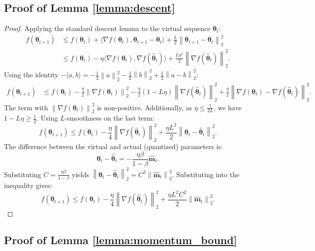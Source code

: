 \documentclass[11pt, a4paper, onecolumn, copyright, goog]{google}
\newcommand{\vect}[1]{\mathbf{#1}}
\newcommand{\vtheta}{\boldsymbol{\theta}}
\newcommand{\vm}{\vect{m}}
\newcommand{\norm}[1]{\left\lVert#1\right\rVert_2}
\newcommand{\inner}[2]{\langle #1, #2 \rangle}
\theoremstyle{plain}
\theoremstyle{definition}
\theoremstyle{remark}
\begin{document}
\subsection{Proof of Lemma \ref{lemma:descent}}
\label{proof:lemma_descent}
\begin{proof}
Applying the standard descent lemma to the virtual sequence $\vtheta_t$:
\begin{align}
    f(\vtheta_{t+1}) &\le f(\vtheta_t) + \inner{\nabla f(\vtheta_t)}{\vtheta_{t+1} - \vtheta_t} + \frac{L}{2} \norm{\vtheta_{t+1} - \vtheta_t}^2 \nonumber \\
    &\le f(\vtheta_t) - \eta \inner{\nabla f(\vtheta_t)}{\nabla f(\hat{\vtheta}_t)} + \frac{L \eta^2}{2} \norm{\nabla f(\hat{\vtheta}_t)}^2.
\end{align}
Using the identity $- \inner{a}{b} = -\frac{1}{2}\norm{a}^2 - \frac{1}{2}\norm{b}^2 + \frac{1}{2}\norm{a-b}^2$:
\begin{align}
    f(\vtheta_{t+1}) &\le f(\vtheta_t) - \frac{\eta}{2} \norm{\nabla f(\vtheta_t)}^2 - \frac{\eta}{2} (1 - L \eta) \norm{\nabla f(\hat{\vtheta}_t)}^2 + \frac{\eta}{2} \norm{\nabla f(\vtheta_t) - \nabla f(\hat{\vtheta}_t)}^2.
\end{align}
The term with $\norm{\nabla f(\vtheta_t)}^2$ is non-positive. Additionally, as $\eta \le \frac{1}{2L}$, we have $1 - L \eta \ge \frac{1}{2}$. Using $L$-smoothness on the last term:
\begin{equation}
    f(\vtheta_{t+1}) \le f(\vtheta_t) - \frac{\eta}{4} \norm{\nabla f(\hat{\vtheta}_t)}^2 + \frac{\eta L^2}{2} \norm{\vtheta_t - \hat{\vtheta}_t}^2.
\end{equation}
The difference between the virtual and actual (quantized) parameters is:
\begin{equation}
    \vtheta_t - \hat{\vtheta}_t = -\frac{\eta \beta}{1-\beta} \hat{\vm}_t.
\end{equation}
Substituting $C = \frac{\eta \beta}{1-\beta}$ yields $\norm{\vtheta_t - \hat{\vtheta}_t}^2 = C^2 \norm{\hat{\vm}_t}^2$.
Substituting into the inequality gives:
\begin{equation}
    f(\vtheta_{t+1}) \le f(\vtheta_t) - \frac{\eta}{4} \norm{\nabla f(\hat{\vtheta}_t)}^2 + \frac{\eta L^2 C^2}{2} \norm{\hat{\vm}_t}^2.
\end{equation}
\end{proof}

\subsection{Proof of Lemma \ref{lemma:momentum_bound}}
\label{proof:lemma_momentum_bound_stoch}
\end{document}
